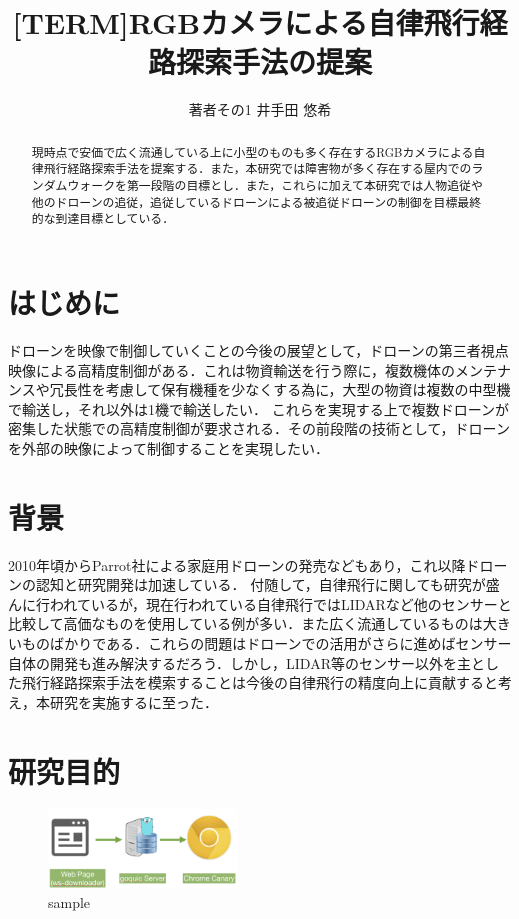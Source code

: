 \documentclass[a4j,10pt]{jsarticle}
\begin{document}

\title{[TERM]RGBカメラによる自律飛行経路探索手法の提案}

\author{
    著者その1 {井手田 悠希}
}

\begin{abstract}
現時点で安価で広く流通している上に小型のものも多く存在するRGBカメラによる自律飛行経路探索手法を提案する．また，本研究では障害物が多く存在する屋内でのランダムウォークを第一段階の目標とし．また，これらに加えて本研究では人物追従や他のドローンの追従，追従しているドローンによる被追従ドローンの制御を目標最終的な到達目標としている．
\end{abstract}

\maketitle
\thispagestyle{empty}

\section{はじめに}
ドローンを映像で制御していくことの今後の展望として，ドローンの第三者視点映像による高精度制御がある．これは物資輸送を行う際に，複数機体のメンテナンスや冗長性を考慮して保有機種を少なくする為に，大型の物資は複数の中型機で輸送し，それ以外は1機で輸送したい．
これらを実現する上で複数ドローンが密集した状態での高精度制御が要求される．その前段階の技術として，ドローンを外部の映像によって制御することを実現したい．

\section{背景}
2010年頃からParrot社による家庭用ドローンの発売などもあり，これ以降ドローンの認知と研究開発は加速している．
付随して，自律飛行に関しても研究が盛んに行われているが，現在行われている自律飛行ではLIDARなど他のセンサーと比較して高価なものを使用している例が多い．また広く流通しているものは大きいものばかりである．これらの問題はドローンでの活用がさらに進めばセンサー自体の開発も進み解決するだろう．しかし，LIDAR等のセンサー以外を主とした飛行経路探索手法を模索することは今後の自律飛行の精度向上に貢献すると考え，本研究を実施するに至った．


\section{研究目的}
\begin{figure}[htbp]
    \includegraphics[width=5cm]{figure1.png}
    \caption{sample}
\end{figure}
 
\end{document}
